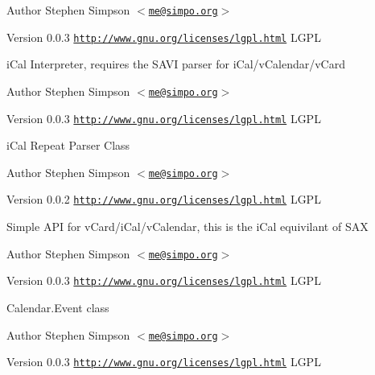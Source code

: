 \begin{DoxyAuthor}{Author}
Stephen Simpson $<$\href{mailto:me@simpo.org}{\tt me@simpo.org}$>$ 
\end{DoxyAuthor}
\begin{DoxyVersion}{Version}
0.0.3  \href{http://www.gnu.org/licenses/lgpl.html}{\tt http://www.gnu.org/licenses/lgpl.html} LGPL
\end{DoxyVersion}
iCal Interpreter, requires the SAVI parser for iCal/vCalendar/vCard

\begin{DoxyAuthor}{Author}
Stephen Simpson $<$\href{mailto:me@simpo.org}{\tt me@simpo.org}$>$ 
\end{DoxyAuthor}
\begin{DoxyVersion}{Version}
0.0.3  \href{http://www.gnu.org/licenses/lgpl.html}{\tt http://www.gnu.org/licenses/lgpl.html} LGPL
\end{DoxyVersion}
iCal Repeat Parser Class

\begin{DoxyAuthor}{Author}
Stephen Simpson $<$\href{mailto:me@simpo.org}{\tt me@simpo.org}$>$ 
\end{DoxyAuthor}
\begin{DoxyVersion}{Version}
0.0.2  \href{http://www.gnu.org/licenses/lgpl.html}{\tt http://www.gnu.org/licenses/lgpl.html} LGPL
\end{DoxyVersion}
Simple API for vCard/iCal/vCalendar, this is the iCal equivilant of SAX

\begin{DoxyAuthor}{Author}
Stephen Simpson $<$\href{mailto:me@simpo.org}{\tt me@simpo.org}$>$ 
\end{DoxyAuthor}
\begin{DoxyVersion}{Version}
0.0.3  \href{http://www.gnu.org/licenses/lgpl.html}{\tt http://www.gnu.org/licenses/lgpl.html} LGPL
\end{DoxyVersion}
Calendar.Event class

\begin{DoxyAuthor}{Author}
Stephen Simpson $<$\href{mailto:me@simpo.org}{\tt me@simpo.org}$>$ 
\end{DoxyAuthor}
\begin{DoxyVersion}{Version}
0.0.3  \href{http://www.gnu.org/licenses/lgpl.html}{\tt http://www.gnu.org/licenses/lgpl.html} LGPL 
\end{DoxyVersion}

